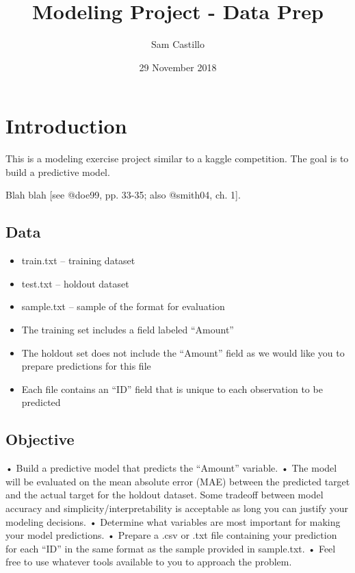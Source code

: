 \documentclass[]{article}
\title{Modeling Project - Data Prep}
\author{Sam Castillo}
\date{29 November 2018}
\providecommand{\tightlist}{%
  \setlength{\itemsep}{0pt}\setlength{\parskip}{0pt}}
\begin{document}
\maketitle

{
\setcounter{tocdepth}{2}
\tableofcontents
}
\section{Introduction}\label{introduction}

This is a modeling exercise project similar to a kaggle competition. The
goal is to build a predictive model.

Blah blah {[}see @doe99, pp. 33-35; also @smith04, ch. 1{]}.

\subsection{Data}\label{data}

\begin{itemize}
\tightlist
\item
  train.txt -- training dataset
\item
  test.txt -- holdout dataset
\item
  sample.txt -- sample of the format for evaluation
\item
  The training set includes a field labeled ``Amount''
\item
  The holdout set does not include the ``Amount'' field as we would like
  you to prepare predictions for this file
\item
  Each file contains an ``ID'' field that is unique to each observation
  to be predicted
\end{itemize}

\subsection{Objective}\label{objective}

• Build a predictive model that predicts the ``Amount'' variable. • The
model will be evaluated on the mean absolute error (MAE) between the
predicted target and the actual target for the holdout dataset. Some
tradeoff between model accuracy and simplicity/interpretability is
acceptable as long you can justify your modeling decisions. • Determine
what variables are most important for making your model predictions. •
Prepare a .csv or .txt file containing your prediction for each ``ID''
in the same format as the sample provided in sample.txt. • Feel free to
use whatever tools available to you to approach the problem.
\end{document}

